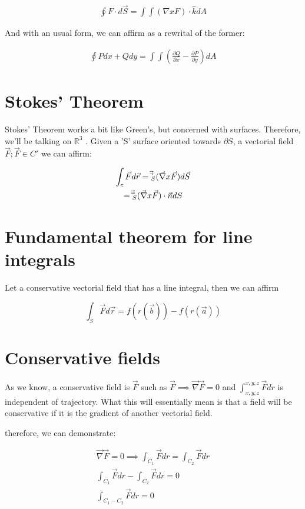 \documentclass[11pt,fleqn]{book} %
\begin{document}
\begin{gather}
    \oint F \cdot d\vec{S} = \int\int (\nabla x F)\cdot \hat{k} dA
\end{gather}

And with an usual form, we can affirm as a rewrital of the former:

\begin{gather}
    \oint P dx + Q dy = \int\int (\frac{\partial Q}{\partial x} - \frac{\partial P}{\partial y}) dA 
\end{gather}

\section{Stokes' Theorem}

Stokes' Theorem works a bit like Green's, but concerned with surfaces. Therefore, we'll be talking on $\mathbb{R}^3$ .
Given a 'S' surface oriented towards $\partial S$, a vectorial field $\vec{F} ; \vec{F} \in C'$ we can affirm:

\begin{gather}
    \int_c \vec{F} d\vec{r} = {\vec\vec}_S (\vec{\nabla} x \vec{F}) d\vec{S}\\
    = {\vec\vec}_S (\vec{\nabla} x \vec{F}) \cdot \vec{n} dS
\end{gather}

\section{Fundamental theorem for line integrals}

Let a conservative vectorial field that has a line integral, then we can affirm

$$\int_S \vec{F} d\vec{r} = f(r(\vec{b})) - f(r(\vec{a}))$$

\section{Conservative fields}

As we know, a conservative field is $\vec{F}$ such as 
$\vec{F} \implies \vec{\nabla} \vec{F} = 0$ and
$\int_{x,y,z}^{x,y,z} \vec{F} dr$ is independent of trajectory. What this will essentially mean is that 
a field will be conservative if it is the gradient of another vectorial field.

therefore, we can demonstrate:

\begin{gather}
    \vec{\nabla} \vec{F} = 0 \implies \int_{C_1} \vec{F} dr = \int_{C_2} \vec{F} dr\\
    \int_{C_1} \vec{F} dr - \int_{C_2} \vec{F} dr = 0 \\
    \int_{C_1 - C_2} \vec{F} dr = 0\\
\end{gather}
\end{document}
